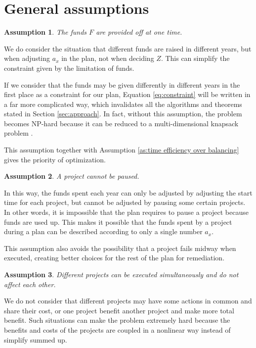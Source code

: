 \documentclass{article}
\newtheorem{assumption}{Assumption}
\begin{document}
\section{General assumptions}
\label{sec:assumptions}

\begin{assumption}
\label{as:funds at one time}
The funds $F$ are provided off at one time.
\end{assumption}

We do consider the situation that different funds are raised in different years,
but when adjusting $a_x$ in the plan, not when deciding $Z$.
This can simplify the constraint given by the limitation of funds.

If we consider that the funds may be given differently in different years in the first place as a constraint for our plan,
Equation \ref{eq:constraint} will be written in a far more complicated way, which invalidates all the algorithms and theorems stated in Section \ref{sec:approach}.
In fact, without this assumption, the problem becomes NP-hard because it can be reduced to a multi-dimensional knapsack problem \cite{2dknapsacknp}.

This assumption together with Assumption \ref{as:time efficiency over balancing} gives the priority of optimization.

\begin{assumption}
\label{as:no pause}
A project cannot be paused.
\end{assumption}

In this way, the funds spent each year can only be adjusted by adjusting the start time for each project,
but cannot be adjusted by pausing some certain projects.
In other words, it is impossible that the plan requires to pause a project because funds are used up.
This makes it possible that the funds spent by a project during a plan can be described according to only a single number $a_x$.

This assumption also avoids the possibility that a project fails midway when executed, creating better choices for the rest of the plan for remediation.

\begin{assumption}
\label{as:no interrelationship}
Different projects can be executed simultaneously and do not affect each other.
\end{assumption}

We do not consider that different projects may have some actions in common and share their cost, or one project benefit another project and make more total benefit.
Such situations can make the problem extremely hard because the benefits and costs of the projects are coupled in a nonlinear way instead of simplify summed up.
\end{document}
